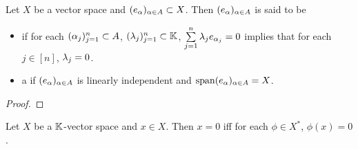 \documentclass{book}
\begin{document}
	\begin{defn}
		Let $X$ be a vector space and $(e_{\alpha})_{\alpha \in A} \subset X$. Then $(e_{\alpha})_{\alpha \in A}$ is said to be
		\begin{itemize}
			\item {} if for each $(\alpha_j)_{j=1}^n \subset A$, $(\lambda_j)_{j=1}^n \subset \mathbb{K}$, $\sum\limits_{j=1}^n \lambda_j e_{\alpha_j} = 0$ implies that for each $j \in [n]$, $\lambda_j = 0$.  
			\item a  if $(e_{\alpha})_{\alpha \in A}$ is linearly independent and $\operatorname{span} (e_{\alpha})_{\alpha \in A} = X$. 
		\end{itemize}
	\end{defn}
	
	\begin{ex}
	\end{ex}

	\begin{proof}
		
	\end{proof}

	\begin{ex}
		
	\end{ex}


	\begin{ex}
		Let $X$ be a $\mathbb{K}$-vector space and $x \in X$. Then $x = 0$ iff for each $\phi \in X^*$, $\phi(x) = 0$. 
	\end{ex}
\end{document}
